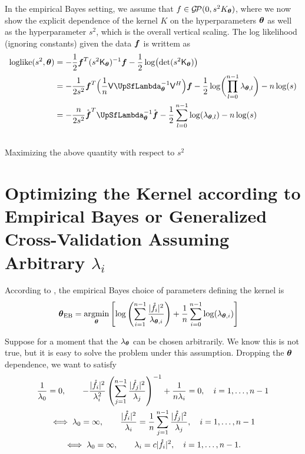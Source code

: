\documentclass{amsart}
\newcommand{\rvf}{\mathring{\vf}}
\newcommand{\gp}{\mathcal{G}\!\mathcal{P}}
\begin{document}
In the empirical Bayes setting, we assume that $f \in \gp(0,s^2K_{\vtheta})$, where we now show the explicit dependence of the
kernel $K$ on the hyperparameters $\boldsymbol{\theta}$ as well as the hyperparameter $s^2$, which is the overall vertical scaling.  
The log likelihood (ignoring constants) given the data $\boldsymbol{f}$ is writtem as 
\begin{align}
	\text{loglike}(s^2,\vtheta) 
	& = - \frac 1{2} \vf^T (s^2\mK_{\vtheta})^{-1}\vf - \frac 12 \log\bigl(\det(s^2 \mK_{\vtheta})\bigr)  \\
	\nonumber 
	& = - \frac 1{2 s^2} \vf^T\Bigl(\frac 1n \mV \mLambda_{\vtheta}^{-1} \mV^H \Bigr)\vf 
	- \frac 12 \log\biggl(\prod_{l=0}^{n-1} \lambda_{\vtheta,l}\biggr) - n \log(s)  \\
	\nonumber 
	& = - \frac n{2 s^2} \rvf^T\mLambda_{\vtheta}^{-1} \rvf 
- \frac 12 \sum_{l=0}^{n-1} \log(\lambda_{\vtheta,l}) - n \log(s)  \\
\nonumber 
\end{align}
Maximizing the above quantity with respect to $s^2$ 



\section{Optimizing the Kernel according to Empirical Bayes or Generalized Cross-Validation Assuming Arbitrary $\lambda_i$}
According to \cite{RatHic19a}, the empirical Bayes choice of parameters defining the kernel is
\begin{align*}
    \boldsymbol{\theta}_{\text{EB}} 
    &= \operatorname*{argmin}_{\boldsymbol{\theta}} \left [\log\left( \sum_{i=1}^{n-1} \frac{\lvert\mathring{f}_i\rvert^2}{\lambda_{\boldsymbol{\theta},i}} \right)
    + \frac 1n \sum_{i=0}^{n-1} \log(\lambda_{\boldsymbol{\theta},i} ) \right ]
\end{align*}

Suppose for a moment that the $\lambda_{\boldsymbol{\theta}}$ can be chosen arbitrarily.   We know this is not true, but it is easy to solve the problem under this assumption.  Dropping the $\boldsymbol{\theta}$ dependence, we want to satisfy
\begin{gather*}
    \frac 1{\lambda_0} = 0, \qquad 
    - \frac{\lvert\mathring{f}_i\rvert^2}{\lambda_{i}^2} \left( \sum_{j=1}^{n-1} \frac{\lvert\mathring{f}_j\rvert^2}{\lambda_{j}} \right)^{-1} + \frac 1{n\lambda_i} = 0, \quad i = 1, \ldots, n-1
    \\
    \iff
    \lambda_0 = \infty, \qquad \frac{\lvert\mathring{f}_i\rvert^2}{\lambda_{i}} = \frac 1n \sum_{j=1}^{n-1} \frac{\lvert\mathring{f}_j\rvert^2}{\lambda_{j}}, \quad i = 1, \ldots, n-1
    \\
    \iff
    \lambda_0 = \infty, \qquad \lambda_i = c \lvert\mathring{f}_i\rvert^2, \quad i = 1, \ldots, n-1.
\end{gather*}
\end{document}
